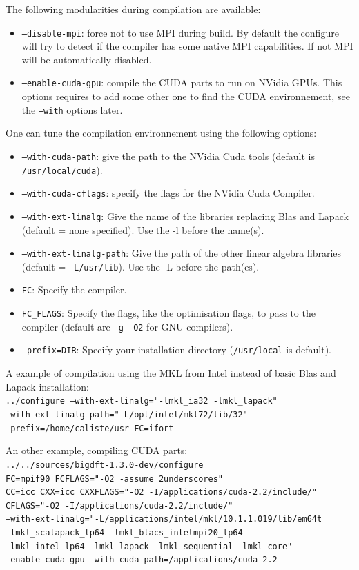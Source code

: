 \documentclass[a4paper,11pt]{report}
\begin{document}
The following modularities during compilation are available:
\begin{itemize}
  \item \texttt{--disable-mpi}: force not to use MPI during build. By default the configure will try to detect if the compiler has some native MPI capabilities. If not MPI will be automatically disabled.
  \item \texttt{--enable-cuda-gpu}: compile the CUDA parts to run on NVidia GPUs. This options requires to add some other one to find the CUDA environnement, see the \texttt{--with} options later.
\end{itemize}

One can tune the compilation environnement using the following options:
\begin{itemize}
  \item \texttt{--with-cuda-path}: give the path to the NVidia Cuda tools (default is \texttt{/usr/local/cuda}).
  \item \texttt{--with-cuda-cflags}: specify the flags for the NVidia Cuda Compiler.
  \item \texttt{--with-ext-linalg}: Give the name of the libraries replacing Blas and Lapack (default = none specified). Use the -l before the name(s).
  \item \texttt{--with-ext-linalg-path}: Give the path of the other linear algebra libraries (default = \texttt{-L/usr/lib}). Use the -L before the path(es).
  \item \texttt{FC}: Specify the compiler.
  \item \texttt{FC_FLAGS}: Specify the flags, like the
optimisation flags, to pass to the compiler (default are \texttt{-g
-O2} for GNU compilers).
  \item \texttt{--prefix=DIR}: Specify your installation directory (\texttt{/usr/local} is default).
\end{itemize}

A example of compilation using the MKL from Intel instead of basic Blas and Lapack installation:\\
\texttt{../configure --with-ext-linalg="-lmkl\_ia32 -lmkl\_lapack"\\
   --with-ext-linalg-path="-L/opt/intel/mkl72/lib/32"\\
   --prefix=/home/caliste/usr FC=ifort}

An other example, compiling CUDA parts:\\
\texttt{../../sources/bigdft-1.3.0-dev/configure\\
  FC=mpif90 FCFLAGS="-O2  -assume 2underscores"\\
  CC=icc CXX=icc CXXFLAGS="-O2  -I/applications/cuda-2.2/include/"\\
  CFLAGS="-O2  -I/applications/cuda-2.2/include/"\\
  --with-ext-linalg="-L/applications/intel/mkl/10.1.1.019/lib/em64t\\
                     -lmkl\_scalapack\_lp64 -lmkl\_blacs\_intelmpi20\_lp64\\
                     -lmkl\_intel\_lp64 -lmkl\_lapack -lmkl\_sequential -lmkl\_core"\\
  --enable-cuda-gpu --with-cuda-path=/applications/cuda-2.2}
\end{document}
